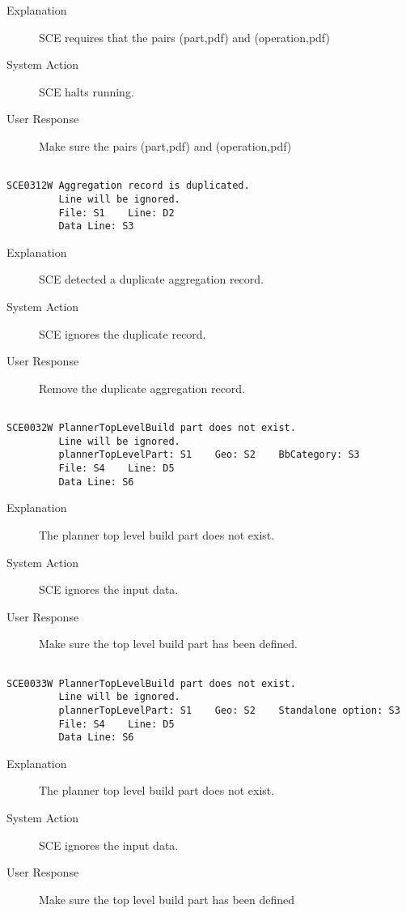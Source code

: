 \begin{description}
\item[Explanation]  SCE requires that the pairs (part,pdf) and (operation,pdf) 


\item[System Action]  SCE halts running.

\item[User Response]  Make sure the pairs (part,pdf) and (operation,pdf) 

\end{description}
\hrulefill
\begin{verbatim}

SCE0312W Aggregation record is duplicated.
         Line will be ignored.
         File: S1    Line: D2
         Data Line: S3
\end{verbatim}
\begin{description}
\item[Explanation]  SCE detected a duplicate aggregation record.

\item[System Action]  SCE ignores the duplicate record.

\item[User Response]  Remove the duplicate aggregation record.
\end{description}
\hrulefill
\begin{verbatim}

SCE0032W PlannerTopLevelBuild part does not exist.
         Line will be ignored.
         plannerTopLevelPart: S1    Geo: S2    BbCategory: S3
         File: S4    Line: D5
         Data Line: S6
\end{verbatim}
\begin{description}
\item[Explanation]  The planner top level build part does not exist.

\item[System Action]  SCE ignores the input data.

\item[User Response]  Make sure the top level build part has been defined.
\end{description}
\hrulefill
\begin{verbatim}

SCE0033W PlannerTopLevelBuild part does not exist.
         Line will be ignored.
         plannerTopLevelPart: S1    Geo: S2    Standalone option: S3
         File: S4    Line: D5
         Data Line: S6
\end{verbatim}
\begin{description}
\item[Explanation]  The planner top level build part does not exist.

\item[System Action]  SCE ignores the input data.

\item[User Response]  Make sure the top level build part has been defined
\end{description}
